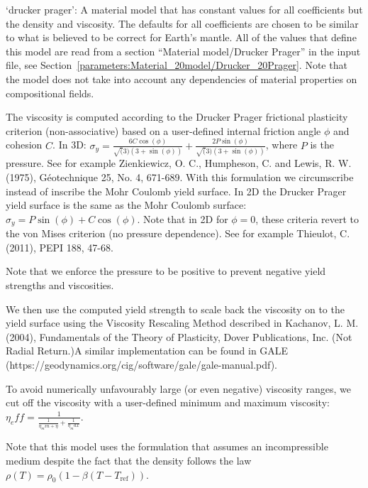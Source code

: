 \begin{itemize}
`drucker prager': A material model that has constant values for all coefficients but the density and viscosity. The defaults for all coefficients are chosen to be similar to what is believed to be correct for Earth's mantle. All of the values that define this model are read from a section ``Material model/Drucker Prager'' in the input file, see Section~\ref{parameters:Material_20model/Drucker_20Prager}. Note that the model does not take into account any dependencies of material properties on compositional fields. 

The viscosity is computed according to the Drucker Prager frictional plasticity criterion (non-associative) based on a user-defined internal friction angle $\phi$ and cohesion $C$. In 3D:  $\sigma_y = \frac{6 C \cos(\phi)}{\sqrt(3) (3+\sin(\phi))} + \frac{2 P \sin(\phi)}{\sqrt(3) (3+\sin(\phi))}$, where $P$ is the pressure. See for example Zienkiewicz, O. C., Humpheson, C. and Lewis, R. W. (1975), G\'{e}otechnique 25, No. 4, 671-689. With this formulation we circumscribe instead of inscribe the Mohr Coulomb yield surface. In 2D the Drucker Prager yield surface is the same as the Mohr Coulomb surface:  $\sigma_y = P \sin(\phi) + C \cos(\phi)$. Note that in 2D for $\phi=0$, these criteria revert to the von Mises criterion (no pressure dependence). See for example Thieulot, C. (2011), PEPI 188, 47-68. 

Note that we enforce the pressure to be positive to prevent negative yield strengths and viscosities. 

We then use the computed yield strength to scale back the viscosity on to the yield surface using the Viscosity Rescaling Method described in Kachanov, L. M. (2004), Fundamentals of the Theory of Plasticity, Dover Publications, Inc. (Not Radial Return.)A similar implementation can be found in GALE (https://geodynamics.org/cig/software/gale/gale-manual.pdf). 

To avoid numerically unfavourably large (or even negative) viscosity ranges, we cut off the viscosity with a user-defined minimum and maximum viscosity: $\eta_eff = \frac{1}{\frac{1}{\eta_min + \eta}+ \frac{1}{\eta_max}}$. 

Note that this model uses the formulation that assumes an incompressible medium despite the fact that the density follows the law $\rho(T)=\rho_0(1-\beta(T-T_{\text{ref}}))$. 


\end{itemize}
